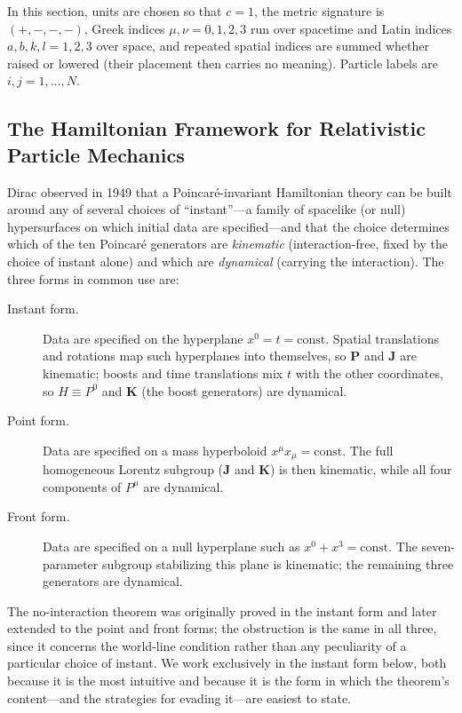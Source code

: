 In this section, units are chosen so that $c=1$, the metric signature is
$(+,-,-,-)$, Greek indices $\mu,\nu=0,1,2,3$ run over spacetime and Latin
indices $a,b,k,l=1,2,3$ over space, and repeated spatial indices are summed
whether raised or lowered (their placement then carries no meaning). Particle
labels are $i,j=1,\dots,N$.

\subsection{The Hamiltonian Framework for Relativistic Particle Mechanics}

Dirac observed in 1949 \cite{Dirac1949} that a Poincar\'e-invariant Hamiltonian
theory can be built around any of several choices of ``instant''---a family of
spacelike (or null) hypersurfaces on which initial data are specified---and
that the choice determines which of the ten Poincar\'e generators are
\emph{kinematic} (interaction-free, fixed by the choice of instant alone) and
which are \emph{dynamical} (carrying the interaction). The three forms in
common use are:
\begin{description}
    \item [Instant form.] Data are specified on the hyperplane
        $x^0=t=\text{const}$. Spatial translations and rotations map such
        hyperplanes into themselves, so ${\bm P}$ and ${\bm J}$ are kinematic; boosts
        and time translations mix $t$ with the other coordinates, so $H\equiv
        P^0$ and ${\bm K}$ (the boost generators) are dynamical.
    \item [Point form.] Data are specified on a mass hyperboloid $x^\mu
        x_\mu=\text{const}$. The full homogeneous Lorentz subgroup (${\bm J}$ and
        ${\bm K}$) is then kinematic, while all four components of $P^\mu$ are
        dynamical.
    \item [Front form.] Data are specified on a null hyperplane such as
        $x^0+x^3=\text{const}$. The seven-parameter subgroup stabilizing this
        plane is kinematic; the remaining three generators are dynamical.
\end{description}

The no-interaction theorem was originally proved in the instant form and later
extended to the point and front forms; the obstruction is the same in all
three, since it concerns the world-line condition rather than any peculiarity
of a particular choice of instant. We work exclusively in the instant form
below, both because it is the most intuitive and because it is the form in
which the theorem's content---and the strategies for evading it---are easiest
to state.

